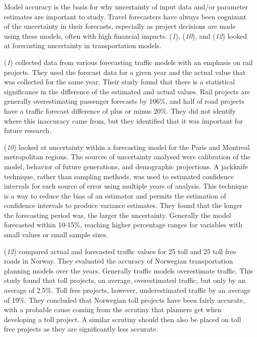\documentclass[
  letterpaper,
]{trb}
\begin{document}
Model accuracy is the basis for why uncertainty of input data and/or
parameter estimates are important to study. Travel forecasters have
always been cognizant of the uncertainty in their forecasts, especially
as project decisions are made using these models, often with high
financial impacts. (\emph{1}), (\emph{10}), and (\emph{12}) looked at
forecasting uncertainty in transportation models.

(\emph{1}) collected data from various forecasting traffic models with
an emphasis on rail projects. They used the forecast data for a given
year and the actual value that was collected for the same year. Their
study found that there is a statistical significance in the difference
of the estimated and actual values. Rail projects are generally
overestimating passenger forecasts by 106\%, and half of road projects
have a traffic forecast difference of plus or minus 20\%. They did not
identify where this inaccuracy came from, but they identified that it
was important for future research.

(\emph{10}) looked at uncertainty within a forecasting model for the
Paris and Montreal metropolitan regions. The sources of uncertainty
analysed were calibration of the model, behavior of future generations,
and demographic projections. A jackknife technique, rather than sampling
methods, was used to estimated confidence intervals for each source of
error using multiple years of analysis. This technique is a way to
reduce the bias of an estimator and permits the estimation of confidence
intervals to produce variance estimates. They found that the longer the
forecasting period was, the larger the uncertainty. Generally the model
forecasted within 10-15\%, reaching higher percentage ranges for
variables with small values or small sample sizes.

(\emph{12}) compared actual and forecasted traffic values for 25 toll
and 25 toll free roads in Norway. They evaluated the accuracy of
Norwegian transportation planning models over the years. Generally
traffic models overestimate traffic. This study found that toll
projects, on average, overestimated traffic, but only by an average of
2.5\%. Toll free projects, however, underestimated traffic by an average
of 19\%. They concluded that Norwegian toll projects have been fairly
accurate, with a probable cause coming from the scrutiny that planners
get when developing a toll project. A similar scrutiny should then also
be placed on toll free projects as they are significantly less accurate.
\end{document}
